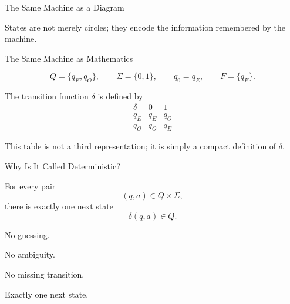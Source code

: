 \documentclass[10pt,aspectratio=169]{beamer}
\begin{document}
\begin{frame}{The Same Machine as a Diagram}

\begin{center}
\end{center}

\vspace{0.5em}

States are not merely circles; they encode the information remembered by the machine.

\end{frame}

\begin{frame}{The Same Machine as Mathematics}

\[
Q=\{q_E,q_O\},
\qquad
\Sigma=\{0,1\},
\qquad
q_0=q_E,
\qquad
F=\{q_E\}.
\]


The transition function $\delta$ is defined by
\[
\begin{array}{c|cc}
\delta & 0 & 1\\
\hline
q_E & q_E & q_O\\
q_O & q_O & q_E
\end{array}
\]


This table is not a third representation; it is simply a compact definition of $\delta$.

\end{frame}

\begin{frame}{Why Is It Called Deterministic?}

For every pair
\[
(q,a)\in Q\times\Sigma,
\]
there is exactly one next state
\[
\delta(q,a)\in Q.
\]

\vspace{1em}


No guessing.

No ambiguity.

No missing transition.

Exactly one next state.

\end{frame}
\end{document}
